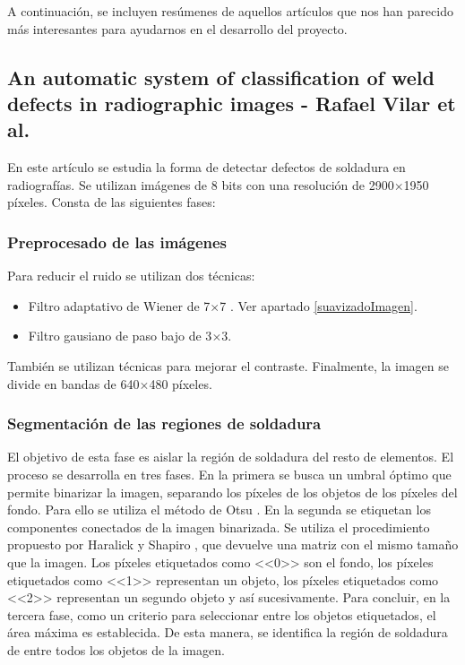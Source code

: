 A continuación, se incluyen resúmenes de aquellos artículos que nos han parecido más interesantes para ayudarnos en el desarrollo del proyecto.


\subsection{An automatic system of classification of weld defects in radiographic images - Rafael Vilar et al.}
En este artículo \cite{vilar2009automatic} se estudia la forma de detectar defectos de soldadura en radiografías. Se utilizan imágenes de 8 bits con una resolución de 2900$\times$1950 píxeles. Consta de las siguientes fases:


\subsubsection{Preprocesado de las imágenes}
Para reducir el ruido se utilizan dos técnicas:
	\begin{itemize}
	\item Filtro adaptativo de Wiener de 7$\times$7 \cite{wiener1949extrapolation}. Ver apartado \ref{suavizadoImagen}.
	\item Filtro gausiano de paso bajo de 3$\times$3.
	\end{itemize}
También se utilizan técnicas para mejorar el contraste.
Finalmente, la imagen se divide en bandas de 640$\times$480 píxeles. 


\subsubsection{Segmentación de las regiones de soldadura}
El objetivo de esta fase es aislar la región de soldadura del resto de elementos. El proceso se desarrolla en tres fases. 
En la primera se busca un umbral óptimo que permite binarizar la imagen, separando los píxeles de los objetos de los píxeles del fondo. Para ello se utiliza el método de Otsu \cite{otsu1979threshold}.
En la segunda se etiquetan los componentes conectados de la imagen binarizada. Se utiliza el procedimiento propuesto por Haralick y Shapiro \cite{haralick1992computer}, que devuelve una matriz con el mismo tamaño que la imagen. Los píxeles etiquetados como <<0>> son el fondo, los píxeles etiquetados como <<1>> representan un objeto, los píxeles etiquetados como <<2>> representan un segundo objeto y así sucesivamente.
Para concluir, en la tercera fase, como un criterio para seleccionar entre los objetos etiquetados, el área máxima es establecida. De esta manera, se identifica la región de soldadura de entre todos los objetos de la imagen.


